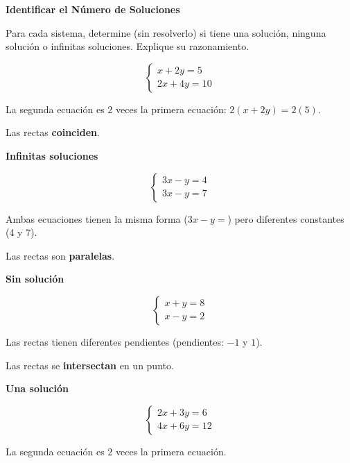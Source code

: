 \begin{exercise}
\textbf{Identificar el Número de Soluciones}

Para cada sistema, determine (sin resolverlo) si tiene una solución, ninguna solución o infinitas soluciones. Explique su razonamiento.

\problem $$\begin{cases}x + 2y = 5 \\ 2x + 4y = 10\end{cases}$$

\begin{solucion}
La segunda ecuación es $2$ veces la primera ecuación: $2(x + 2y) = 2(5)$.

Las rectas \textbf{coinciden}.

\textbf{Infinitas soluciones}
\end{solucion}

\problem $$\begin{cases}3x - y = 4 \\ 3x - y = 7\end{cases}$$

\begin{solucion}
Ambas ecuaciones tienen la misma forma ($3x - y =$) pero diferentes constantes (4 y 7).

Las rectas son \textbf{paralelas}.

\textbf{Sin solución}
\end{solucion}

\problem $$\begin{cases}x + y = 8 \\ x - y = 2\end{cases}$$

\begin{solucion}
Las rectas tienen diferentes pendientes (pendientes: $-1$ y $1$).

Las rectas se \textbf{intersectan} en un punto.

\textbf{Una solución}
\end{solucion}

\problem $$\begin{cases}2x + 3y = 6 \\ 4x + 6y = 12\end{cases}$$

\begin{solucion}
La segunda ecuación es $2$ veces la primera ecuación.


\end{solucion}
\end{exercise}
